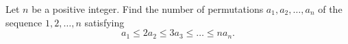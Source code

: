 Let $n$ be a positive integer. Find the number of permutations $a_1, a_2, \ldots, a_n$ of the sequence $1, 2, \ldots, n$ satisfying
\[ a_1 \leq 2a_2 \leq 3a_3 \leq \ldots \leq na_n. \]
